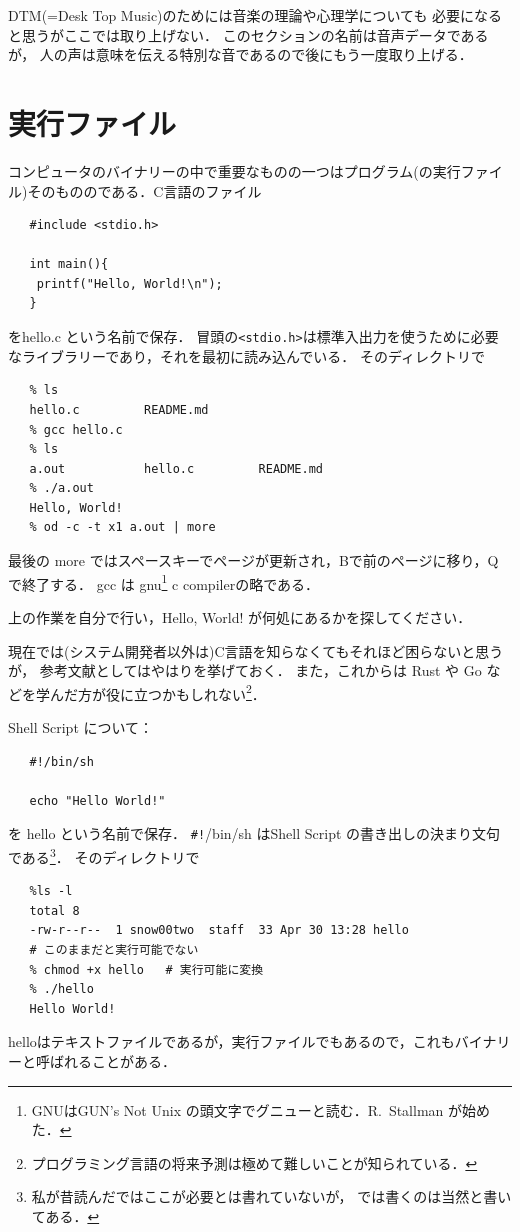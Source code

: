    DTM(=Desk Top Music)のためには音楽の理論や心理学についても
   必要になると思うがここでは取り上げない．
   このセクションの名前は音声データであるが，
   人の声は意味を伝える特別な音であるので後にもう一度取り上げる．
  
\section{実行ファイル}
コンピュータのバイナリーの中で重要なものの一つはプログラム(の実行ファイル)そのもののである．C言語のファイル
\begin{verbatim}
   #include <stdio.h>
   
   int main(){
   	printf("Hello, World!\n");
   }
\end{verbatim}
をhello.c という名前で保存．
冒頭の\verb/<stdio.h>/は標準入出力を使うために必要なライブラリーであり，それを最初に読み込んでいる．
そのディレクトリで
\begin{verbatim}
   % ls
   hello.c         README.md
   % gcc hello.c 
   % ls
   a.out           hello.c         README.md
   % ./a.out
   Hello, World!
   % od -c -t x1 a.out | more
\end{verbatim}
最後の more ではスペースキーでページが更新され，Bで前のページに移り，Qで終了する．
gcc は gnu\footnote{GNUはGUN's Not Unix の頭文字でグニューと読む．R.~Stallman が始めた．} c compilerの略である．

\begin{Q}
上の作業を自分で行い，Hello, World! が何処にあるかを探してください．
\end{Q}
現在では(システム開発者以外は)C言語を知らなくてもそれほど困らないと思うが，
参考文献としてはやはり\cite{KR}を挙げておく．
また，これからは Rust や Go などを学んだ方が役に立つかもしれない\footnote{プログラミング言語の将来予測は極めて難しいことが知られている．}．
\emptyline 

Shell Script について：
\begin{verbatim}
   #!/bin/sh
   
   echo "Hello World!"
\end{verbatim}
を hello という名前で保存．
\verb/#!//bin/sh はShell Script の書き出しの決まり文句である\footnote{私が昔読んだ\cite{KP}ではここが必要とは書れていないが，\cite{Ya} では書くのは当然と書いてある．}．
そのディレクトリで
\begin{verbatim}
   %ls -l
   total 8
   -rw-r--r--  1 snow00two  staff  33 Apr 30 13:28 hello
   # このままだと実行可能でない
   % chmod +x hello   # 実行可能に変換
   % ./hello
   Hello World!
\end{verbatim}
helloはテキストファイルであるが，実行ファイルでもあるので，これもバイナリーと呼ばれることがある．

